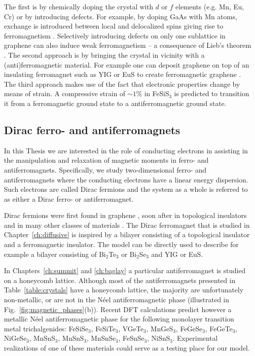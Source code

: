 The first is by chemically doping the crystal with $d$ or $f$ elements (e.g. Mn, Eu, Cr) or by introducing defects. For example, by doping GaAs with Mn atoms, exchange is introduced between local and delocalized spins giving rise to ferromagnetism \cite{dietl_dilute_2014}. Selectively introducing defects on only one sublattice in graphene can also induce weak ferromagnetism -- a consequence of Lieb's theorem \cite{?}. The second approach is by bringing the crystal in vicinity with a (anti)ferromagnetic material. For example one can deposit graphene on top of an insulating ferromagnet such as YIG or EuS to create ferromagnetic graphene \cite{wang_proximity-induced_2015,leutenantsmeyer_proximity_2016}. The third approach makes use of the fact that electronic properties change by means of strain. A compressive strain of $\sim1\%$ in FeSiS$_3$ is predicted \cite{chittari_carrier-_2020} to transition it from a ferromagnetic ground state to a antiferromagnetic ground state. 

\subsection{Dirac ferro- and antiferromagnets}
In this Thesis we are interested in the role of conducting electrons in assisting in the manipulation and relaxation of magnetic moments in ferro- and antiferromagnets. Specifically, we study two-dimensional ferro- and antiferromagnets where the conducting electrons have a linear energy dispersion. Such electrons are called Dirac fermions and the system as a whole is referred to as either a Dirac ferro- or antiferromagnet. 

Dirac fermions were first found in graphene \cite{novoselov_electric_2004, novoselov_two-dimensional_2005-1, novoselov_two-dimensional_2005}, soon after in topological insulators \cite{hasan_colloquium_2010, konig_quantum_2008, qi_quantum_2009, cayssol_introduction_2013} and in many other classes of materials \cite{?}. The Dirac ferromagnet that is studied in Chapter~\ref{ch:diffusive} is inspired by a bilayer consisting of a topological insulator and a ferromagnetic insulator. The model can be directly used to describe for example a bilayer consisting of Bi$_2$Te$_3$ or Bi$_2$Se$_3$ and YIG or EuS. 

In Chapters~\ref{ch:summit} and \ref{ch:baglay} a particular antiferromagnet is studied on a honeycomb lattice. Although most of the antiferromagnets presented in Table~\ref{table:crystals} have a honeycomb lattice, the majority are unfortunately non-metallic, or are not in the N\'eel antiferromagnetic phase (illustrated in Fig.~\ref{fig:magnetic_phases}(b)). Recent DFT calculations \cite{chittari_carrier-_2020} predict however a metallic N\'eel antiferromagnetic phase for the following monolayer transition metal trichalgenides: FeSiSe$_3$, FeSiTe$_3$, VGeTe$_3$, MnGeS$_3$, FeGeSe$_3$, FeGeTe$_3$, NiGeSe$_3$, MnSnS$_3$, MnSnS$_3$, MnSnSe$_3$, FeSnSe$_3$, NiSnS$_3$. Experimental realizations of one of these materials could serve as a testing place for our model. 

